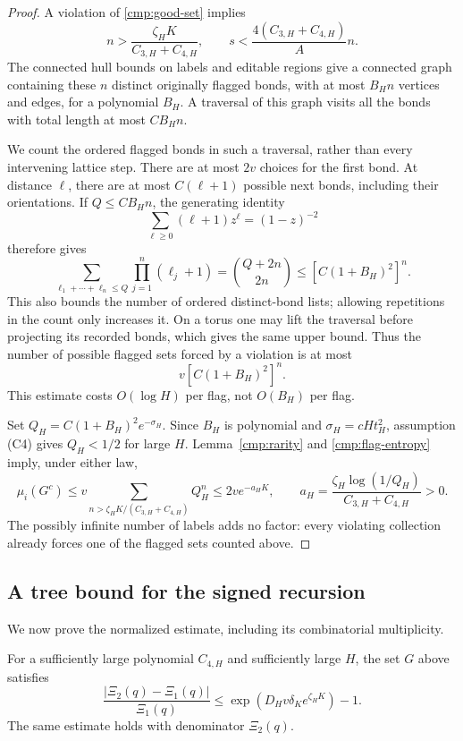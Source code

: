 \begin{proof}
A violation of \eqref{cmp:good-set} implies
\[
 n>\frac{\zeta_HK}{C_{3,H}+C_{4,H}},\qquad
 s<\frac{4(C_{3,H}+C_{4,H})}{A}n.
\]
The connected hull bounds on labels and editable regions give a
connected graph containing these \(n\) distinct originally flagged
bonds, with at most \(B_Hn\) vertices and edges, for a polynomial
\(B_H\).  A traversal of this graph visits all the bonds with total
length at most \(CB_Hn\).

We count the ordered flagged bonds in such a traversal, rather than
every intervening lattice step.  There are at most \(2v\) choices for
the first bond.  At distance \(\ell\), there are at most
\(C(\ell+1)\) possible next bonds, including their orientations.
If \(Q\le CB_Hn\), the generating identity
\[
 \sum_{\ell\ge0}(\ell+1)z^\ell=(1-z)^{-2}
\]
therefore gives
\[
 \sum_{\ell_1+\cdots+\ell_n\le Q}
              \prod_{j=1}^n(\ell_j+1)
 =\binom{Q+2n}{2n}
 \le [C(1+B_H)^2]^n .
\]
This also bounds the number of ordered distinct-bond lists; allowing
repetitions in the count only increases it.  On a torus one may lift
the traversal before projecting its recorded bonds, which gives the
same upper bound.  Thus the number of possible flagged sets forced by
a violation is at most
\begin{equation}
 v[C(1+B_H)^2]^n .
 \label{cmp:flag-entropy}
\end{equation}
This estimate costs \(O(\log H)\) per flag, not \(O(B_H)\) per flag.

Set \(Q_H=C(1+B_H)^2e^{-\sigma_H}\).  Since \(B_H\) is polynomial and
\(\sigma_H=cHt_H^2\), assumption (C4) gives \(Q_H<1/2\) for large \(H\).
Lemma~\ref{cmp:rarity} and \eqref{cmp:flag-entropy} imply, under either law,
\[
 \mu_i(G^c)
 \le v\sum_{n>\zeta_HK/(C_{3,H}+C_{4,H})}Q_H^n
 \le2v e^{-a_HK},\qquad
 a_H=\frac{\zeta_H\log(1/Q_H)}{C_{3,H}+C_{4,H}}>0 .
\]
The possibly infinite number of labels adds no factor: every violating
collection already forces one of the flagged sets counted above.
\end{proof}

\subsection{A tree bound for the signed recursion}

We now prove the normalized estimate, including its combinatorial
multiplicity.

\begin{lemma}
\label{cmp:forest}
For a sufficiently large polynomial \(C_{4,H}\) and sufficiently large
\(H\), the set \(G\) above satisfies
\begin{equation}
 \frac{|\Xi_2(q)-\Xi_1(q)|}{\Xi_1(q)}
 \le \exp(D_Hv\delta_K e^{\zeta_HK})-1 .
 \label{cmp:forest-conclusion}
\end{equation}
The same estimate holds with denominator \(\Xi_2(q)\).
\end{lemma}

